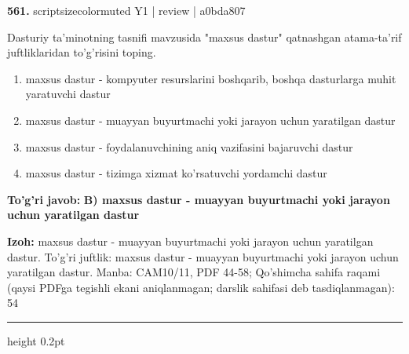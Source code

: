 \documentclass[10pt,a4paper]{article}
\begin{document}
{\bfseries\sffamily\color{ink} 561.} {scriptsizecolor{muted} Y1 | review | a0bda807}
\par
Dasturiy ta'minotning tasnifi mavzusida "maxsus dastur" qatnashgan atama-ta'rif juftliklaridan to'g'risini toping.
\begin{enumerate}[label=\Alph*),leftmargin=9mm]
\item maxsus dastur - kompyuter resurslarini boshqarib, boshqa dasturlarga muhit yaratuvchi dastur
\item maxsus dastur - muayyan buyurtmachi yoki jarayon uchun yaratilgan dastur
\item maxsus dastur - foydalanuvchining aniq vazifasini bajaruvchi dastur
\item maxsus dastur - tizimga xizmat ko'rsatuvchi yordamchi dastur
\end{enumerate}
\begin{tcolorbox}[enhanced,breakable,colback=teal!4,colframe=teal!60!black,boxrule=0.45pt,arc=1.2mm,left=2.7mm,right=2.7mm,top=1.8mm,bottom=1.8mm,before skip=2mm,after skip=2mm]
{\bfseries\sffamily\color{teal}To'g'ri javob:} \textbf{B) maxsus dastur - muayyan buyurtmachi yoki jarayon uchun yaratilgan dastur}
\par\smallskip
{\bfseries Izoh:} maxsus dastur - muayyan buyurtmachi yoki jarayon uchun yaratilgan dastur. To'g'ri juftlik: maxsus dastur - muayyan buyurtmachi yoki jarayon uchun yaratilgan dastur. Manba: CAM10/11, PDF 44-58; Qo'shimcha sahifa raqami (qaysi PDFga tegishli ekani aniqlanmagan; darslik sahifasi deb tasdiqlanmagan): 54
\end{tcolorbox}
\vspace{2mm}\hrule height 0.2pt\vspace{3mm}
\end{document}
